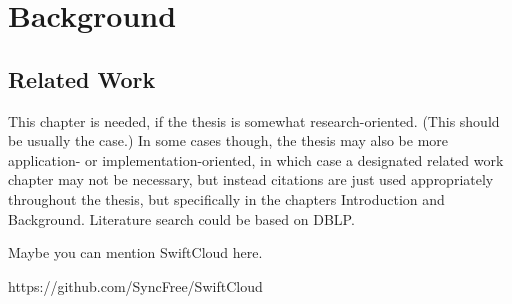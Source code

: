 \chapter{Background}
\label{Background}



\section{Related Work}

This chapter is needed, if the thesis is somewhat research-oriented. (This should be usually the case.) In some cases though, the thesis may also be more application- or implementation-oriented, in which case a designated related work chapter may not be necessary, but instead citations are just used appropriately throughout the thesis, but specifically in the chapters Introduction and Background. Literature search could be based on DBLP.

Maybe you can mention SwiftCloud here.

https://github.com/SyncFree/SwiftCloud

